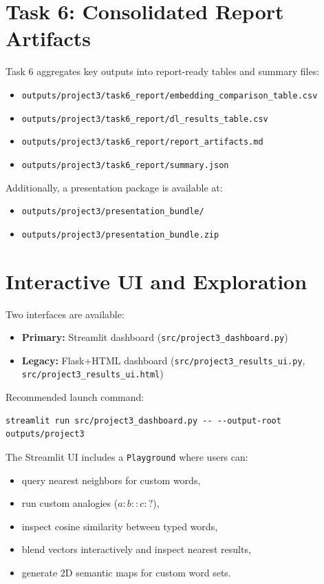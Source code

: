 \documentclass[11pt]{article}
\begin{document}
\section{Task 6: Consolidated Report Artifacts}
Task 6 aggregates key outputs into report-ready tables and summary files:
\begin{itemize}
    \item \texttt{outputs/project3/task6\_report/embedding\_comparison\_table.csv}
    \item \texttt{outputs/project3/task6\_report/dl\_results\_table.csv}
    \item \texttt{outputs/project3/task6\_report/report\_artifacts.md}
    \item \texttt{outputs/project3/task6\_report/summary.json}
\end{itemize}

Additionally, a presentation package is available at:
\begin{itemize}
    \item \texttt{outputs/project3/presentation\_bundle/}
    \item \texttt{outputs/project3/presentation\_bundle.zip}
\end{itemize}

\section{Interactive UI and Exploration}
Two interfaces are available:
\begin{itemize}
    \item \textbf{Primary:} Streamlit dashboard (\texttt{src/project3\_dashboard.py})
    \item \textbf{Legacy:} Flask+HTML dashboard (\texttt{src/project3\_results\_ui.py}, \texttt{src/project3\_results\_ui.html})
\end{itemize}

Recommended launch command:
\begin{verbatim}
streamlit run src/project3_dashboard.py -- --output-root outputs/project3
\end{verbatim}

The Streamlit UI includes a \texttt{Playground} where users can:
\begin{itemize}
    \item query nearest neighbors for custom words,
    \item run custom analogies (\(a:b::c:?\)),
    \item inspect cosine similarity between typed words,
    \item blend vectors interactively and inspect nearest results,
    \item generate 2D semantic maps for custom word sets.
\end{itemize}
\end{document}
